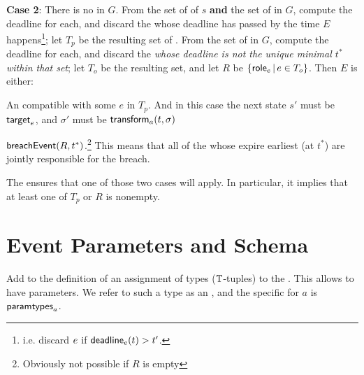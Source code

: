 \documentclass[12pt]{article}
\begin{document}
{\bf Case 2}: There is no \enabled \mustntran in $G$. From the set of \enabled \mayntrans of $s$ {\bf and} the set of \enabled \rmustntrans in $G$, compute the deadline for each, and discard the \transitions whose deadline has passed by the time $E$ happens\footnote{i.e. discard $e$ if $\textsf{deadline}_{e}(t) > t'$.};  let $T_p$ be the resulting set of \transitions. From the set of \enabled \rmustntrans in $G$, compute the deadline for each, and discard the {\transitions} {\it whose deadline is not the unique minimal \TimeStamp $t^*$ within that set}; let $T_o$ be the resulting set, and let $R$ be $\{ \textsf{role}_{e} \, \vert \, e \in T_{o} \}$. Then $E$ is either:
\begin{PPI}
	\item An \Event compatible with some \transition $e$ in $T_p$. And in this case the next state $s'$ must be $\textsf{target}_{e}$, and $\sigma'$ must be $\textsf{transform}_{a}(t,\sigma)$
	\item $\textsf{breachEvent}(R,t^*)$.\footnote{Obviously not possible if $R$ is empty} This means that all of the \Roles whose \enabled \rmustntran expire earliest (at $t^*$) are jointly responsible for the breach.
\end{PPI}
The \bostgcz ensures that one of those two cases will apply. In particular, it implies that at least one of $T_p$ or $R$ is nonempty.














\section{Event Parameters and Schema} \label{eventparams}

Add to the definition of \Contract an assignment of types ($\mathbb{T}$-tuples) to the \Actions. This allows \Events to have parameters. We refer to such a type as an , and the specific \AParamsDomain for \Action $a$ is $\textsf{paramtypes}_{a}$.
\end{document}
